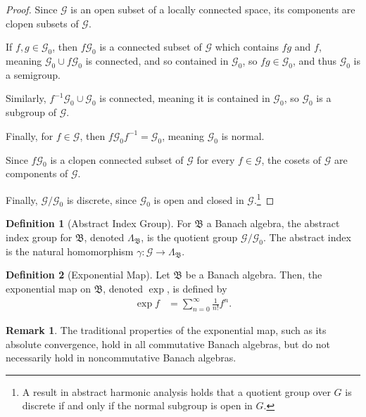 \documentclass[12pt]{extarticle}
\theoremstyle{plain}
\theoremstyle{definition}
\newtheorem*{definition}{Definition}
\theoremstyle{note}
\newtheorem*{remark}{Remark}
\renewcommand{\newline}{\hfill\break}
\begin{document}
\begin{proof}
  Since $\mathcal{G}$ is an open subset of a locally connected space, its components are clopen subsets of $\mathcal{G}$.\newline

  If $f,g\in \mathcal{G}_0$, then $f\mathcal{G}_0$ is a connected subset of $\mathcal{G}$ which contains $fg$ and $f$, meaning $\mathcal{G}_0 \cup f\mathcal{G}_0$ is connected, and so contained in $\mathcal{G}_0$, so $fg\in \mathcal{G}_0$, and thus $\mathcal{G}_0$ is a semigroup.\newline

  Similarly, $f^{-1}\mathcal{G}_0\cup \mathcal{G}_0$ is connected, meaning it is contained in $\mathcal{G}_0$, so $\mathcal{G}_0$ is a subgroup of $\mathcal{G}$.\newline

  Finally, for $f\in \mathcal{G}$, then $f\mathcal{G}_0 f^{-1} = \mathcal{G}_0$, meaning $\mathcal{G}_0$ is normal.\newline

  Since $f\mathcal{G}_0$ is a clopen connected subset of $\mathcal{G}$ for every $f\in \mathcal{G}$, the cosets of $\mathcal{G}$ are components of $\mathcal{G}$.\newline

  Finally, $\mathcal{G}/\mathcal{G}_0$ is discrete, since $\mathcal{G}_0$ is open and closed in $\mathcal{G}$.\footnote{A result in abstract harmonic analysis holds that a quotient group over $G$ is discrete if and only if the normal subgroup is open in $G$.}
\end{proof}
\begin{definition}[Abstract Index Group]
  For $\mathfrak{B}$ a Banach algebra, the abstract index group for $\mathfrak{B}$, denoted $\Lambda_{\mathfrak{B}}$, is the quotient group $\mathcal{G}/\mathcal{G}_0$. The abstract index is the natural homomorphism $\gamma: \mathcal{G}\rightarrow \Lambda_{\mathfrak{B}}$.
\end{definition}
\begin{definition}[Exponential Map]
  Let $\mathfrak{B}$ be a Banach algebra. Then, the exponential map on $\mathfrak{B}$, denoted $\exp$, is defined by
  \begin{align*}
    \exp f &= \sum_{n=0}^{\infty}\frac{1}{n!}f^n.
  \end{align*}
\end{definition}
\begin{remark}
  The traditional properties of the exponential map, such as its absolute convergence, hold in all commutative Banach algebras, but do not necessarily hold in noncommutative Banach algebras.
\end{remark}
\end{document}
